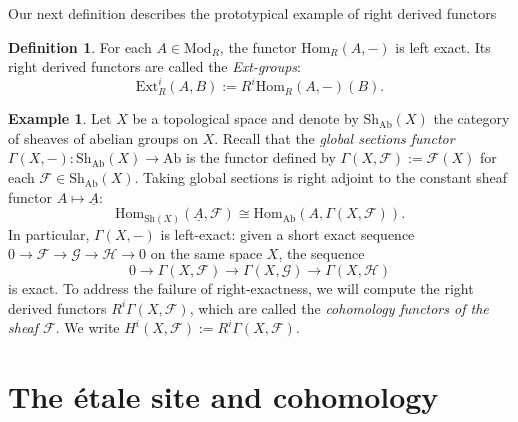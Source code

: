 \documentclass{article}
\def\~#1{\mathscr{#1}}
\numberwithin{equation}{section}
\numberwithin{figure}{section}
\newcommand{\Hom}{\mathrm{Hom}}
\newcommand{\Ext}{\mathrm{Ext}}
\newcommand{\Ab}{\mathrm{Ab}}
\newcommand{\Mod}{\mathrm{Mod}}
\newcommand{\Sh}{\mathrm{Sh}}
\theoremstyle{plain}
\theoremstyle{definition}
\newtheorem{defn}[thm]{Definition}
\newtheorem{ex}[thm]{Example}
\theoremstyle{remark}
\begin{document}
Our next definition describes the prototypical example of right derived functors  
\begin{defn}
    For each $A \in \Mod_R$, the functor $\Hom_R(A,-)$ is left exact. Its right derived functors are called the \emph{Ext-groups}:
    \[\Ext^i_R(A,B) := R^i \Hom_R(A, -)(B).\]
\end{defn}

\begin{ex}
Let $X$ be a topological space and denote by $\Sh_{\Ab}(X)$ the category of sheaves of abelian groups on $X$. Recall that the \emph{global sections functor} $\Gamma(X, -): \Sh_{\Ab}(X) \to \Ab$ is the functor defined by $\Gamma(X, \~F) := \~F(X)$ for each $\~F \in \Sh_\Ab(X)$. Taking global sections is right adjoint to the constant sheaf functor $A \mapsto \underline{A}$:
\[\Hom_{\Sh(X)}(\underline{A}, \~F) \cong \Hom_{\Ab}(A, \Gamma(X,\~F)).\]
In particular, $\Gamma(X, -)$ is left-exact: given a short exact sequence $0 \to \~F \to \~G \to \~H \to 0$ on the same space $X$, the sequence
\[0 \to\Gamma(X, \~F) \to\Gamma(X, \~G) \to \Gamma(X, \~H) \]
is exact. To address the failure of right-exactness, we will compute the right derived functors $R^i\Gamma(X, \~F)$, which are called the \emph{cohomology functors of the sheaf $\~F$}. We write $H^i(X, \~F) := R^i\Gamma(X, \~F)$.
\end{ex}


\section{The \'etale site and cohomology}

\end{document}
